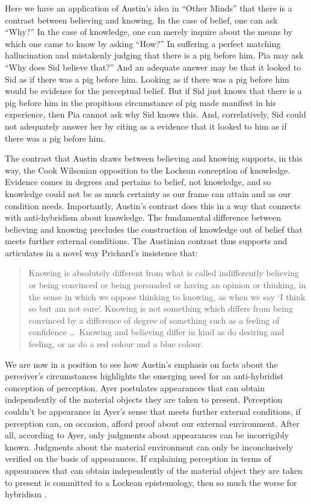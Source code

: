 Here we have an application of Austin's \citeyearpar{Austin:1961kl} idea in ``Other Minds'' that there is a contrast between believing and knowing. In the case of belief, one can ask ``Why?'' In the case of knowledge, one can merely inquire about the means by which one came to know by asking ``How?'' In suffering a perfect matching hallucination and mistakenly judging that there is a pig before him, Pia may ask ``Why does Sid believe that?'' And an adequate answer may be that it looked to Sid as if there was a pig before him. Looking as if there was a pig before him would be evidence for the perceptual belief. But if Sid just knows that there is a pig before him in the propitious circumstance of pig made manifest in his experience, then Pia cannot ask why Sid knows this. And, correlatively, Sid could not adequately answer her by citing as a evidence that it looked to him as if there was a pig before him. 

The contrast that Austin draws between believing and knowing supports, in this way, the Cook Wilsonian opposition to the Lockean conception of knowledge. Evidence comes in degrees and pertains to belief, not knowledge, and so knowledge could not be as much certainty as our frame can attain and as our condition needs. Importantly, Austin's contrast does this in a way that connects with anti-hybridism about knowledge. The fundamental difference between believing and knowing precludes the construction of knowledge out of belief that meets further external conditions. The Austinian contrast thus supports and articulates in a novel way Prichard's insistence that:
\begin{quote}
    Knowing is absolutely different from what is called indifferently believing or being convinced or being persuaded or having an opinion or thinking, in the sense in which we oppose thinking to knowing, as when we say `I think so but am not sure'. Knowing is not something which differs from being convinced by a difference of degree of something such as a feeling of confidence \ldots\ Knowing and believing differ in kind as do desiring and feeling, or as do a red colour and a blue colour. \citep[87]{Prichard:1950tg}
\end{quote} 

We are now in a position to see how Austin's emphasis on facts about the perceiver's circumstances highlights the emerging need for an anti-hybridist conception of perception. Ayer postulates appearances that can obtain independently of the material objects they are taken to present. Perception couldn't be appearance in Ayer's sense that meets further external conditions, if perception can, on occasion, afford proof about our external environment. After all, according to Ayer, only judgments about appearances can be incorrigibly known. Judgments about the material environment can only be inconclusively verified on the basis of appearances. If explaining perception in terms of appearances that can obtain independently of the material object they are taken to present is committed to a Lockean epistemology, then so much the worse for hybridism \citep[see][for a contemporary development of this negative thought]{Putnam:1994kx}. 

